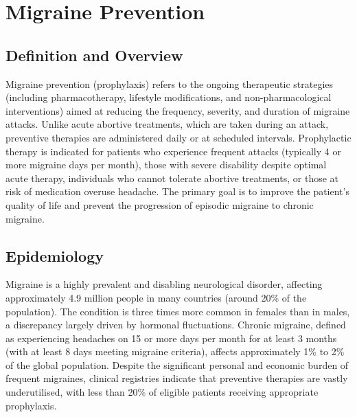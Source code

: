 \chapter{Migraine Prevention}

\section*{Definition and Overview}
Migraine prevention (prophylaxis) refers to the ongoing therapeutic strategies (including pharmacotherapy, lifestyle modifications, and non-pharmacological interventions) aimed at reducing the frequency, severity, and duration of migraine attacks. Unlike acute abortive treatments, which are taken during an attack, preventive therapies are administered daily or at scheduled intervals. Prophylactic therapy is indicated for patients who experience frequent attacks (typically 4 or more migraine days per month), those with severe disability despite optimal acute therapy, individuals who cannot tolerate abortive treatments, or those at risk of medication overuse headache. The primary goal is to improve the patient's quality of life and prevent the progression of episodic migraine to chronic migraine.

\section*{Epidemiology}
Migraine is a highly prevalent and disabling neurological disorder, affecting approximately 4.9 million people in many countries (around 20\% of the population). The condition is three times more common in females than in males, a discrepancy largely driven by hormonal fluctuations. Chronic migraine, defined as experiencing headaches on 15 or more days per month for at least 3 months (with at least 8 days meeting migraine criteria), affects approximately 1\% to 2\% of the global population. Despite the significant personal and economic burden of frequent migraines, clinical registries indicate that preventive therapies are vastly underutilised, with less than 20\% of eligible patients receiving appropriate prophylaxis.

